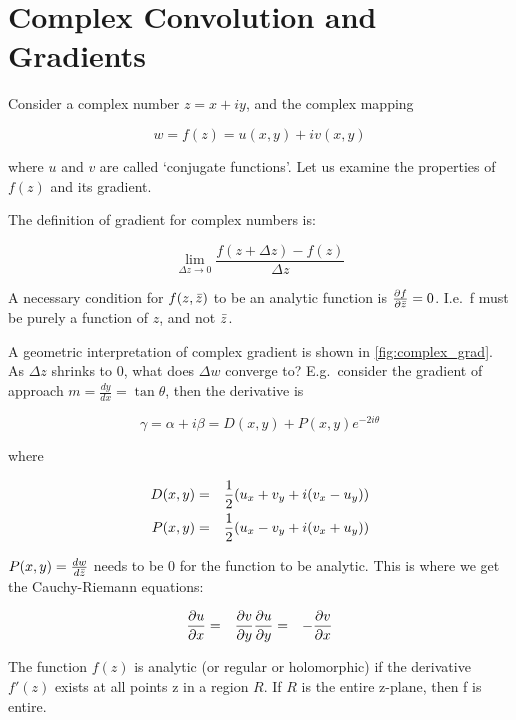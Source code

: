 \chapter{Complex Convolution and Gradients}\label{app:ch6:complex_backprop}

Consider a complex number $z=x+iy$, and the complex mapping 

$$w=f(z) = u(x,y) + iv(x,y)$$ 

where $u$ and $v$ are called `conjugate functions'. Let us examine the
properties of $f(z)$ and its gradient. 

The definition of gradient for complex numbers is:

$$ \lim_{\Delta z\to 0} \frac{f(z + \Delta z) - f(z)}{\Delta z}$$

A necessary condition for $f(z,\bar{z})$ to be an analytic function is
$\frac{\partial f}{\partial \bar{z}}=0$. I.e.\ f must be purely a function of $z$, and not
$\bar{z}$.

A geometric interpretation of complex gradient is shown in
\autoref{fig:complex_grad}.  As $\Delta z$ shrinks to 0, what does $\Delta w$
converge to? E.g.\ consider the gradient of approach $m=\frac{dy}{dx}=\tan
\theta$, then the derivative is

$$\gamma = \alpha + i\beta = D(x,y) + P(x,y)e^{-2i\theta}$$

where

\begin{eqnarray}
  D(x,y) & = & \frac{1}{2}(u_x + v_y + i(v_x - u_y)) \\
  P(x,y) & = & \frac{1}{2}(u_x - v_y + i(v_x + u_y))
\end{eqnarray}

$P(x,y)=\frac{dw}{d\bar{z}}$ needs to be 0 for the function to be analytic.
This is where we get the Cauchy-Riemann equations:

\begin{eqnarray}
  \frac{\partial u}{\partial x}&=& \frac{\partial v}{\partial y} 
  \frac{\partial u}{\partial y}&=& -\frac{\partial v}{\partial x}
\end{eqnarray}

The function $f(z)$ is analytic (or regular or holomorphic) if the derivative 
$f'(z)$ exists at all points z in a region $R$. If $R$ is the entire z-plane,
then f is entire. 

\begin{figure}[!h]
	\centering
  
  \label{fig:complex_grad}
\end{figure}

